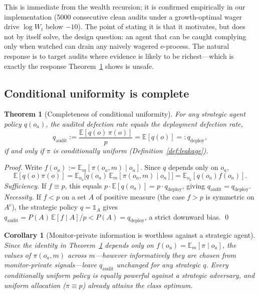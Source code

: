\documentclass[sigconf,anonymous]{aamas}
\theoremstyle{plain}
\newtheorem{theorem}{Theorem}
\newtheorem{corollary}{Corollary}
\theoremstyle{definition}
\begin{document}
This is immediate from the wealth recursion; it is confirmed empirically in
our implementation (5000 consecutive clean audits under a growth-optimal
wager drive $\log W_t$ below $-10$). The point of stating it is that it
motivates, but does not by itself solve, the design question: an agent that
can be caught complying only when watched can drain any naively wagered
e-process. The natural response is to target audits where evidence is
likely to be richest---which is exactly the response Theorem~\ref{thm:conditional-uniformity}
shows is unsafe.

\subsection{Conditional uniformity is complete}

\begin{theorem}[Completeness of conditional uniformity]
\label{thm:conditional-uniformity}
For any strategic agent policy $q(o_a)$, the audited defection rate equals
the deployment defection rate,
\[q_{\mathrm{audit}} := \frac{\mathbb{E}[q(o)\,\pi(o)]}{p} = \mathbb{E}[q(o)] =: q_{\mathrm{deploy}},\]
\emph{if and only if} $\pi$ is conditionally uniform (Definition~\ref{def:leakage}).
\end{theorem}

\begin{proof}
Write $f(o_a) := \mathbb{E}_m[\pi(o_a,m)\mid o_a]$. Since $q$ depends only
on $o_a$,
\[\mathbb{E}[q(o)\pi(o)] = \mathbb{E}_{o_a}\big[q(o_a)\,\mathbb{E}_m[\pi(o_a,m)\mid o_a]\big] = \mathbb{E}_{o_a}[q(o_a)f(o_a)].\]
\emph{Sufficiency.} If $f \equiv p$, this equals $p\cdot\mathbb{E}[q(o_a)] =
p\cdot q_{\mathrm{deploy}}$, giving $q_{\mathrm{audit}} = q_{\mathrm{deploy}}$.
\emph{Necessity.} If $f < p$ on a set $A$ of positive measure (the case
$f>p$ is symmetric on $A^c$), the strategic policy $q = \mathbb{1}_A$ gives
$q_{\mathrm{audit}} = P(A)\,\mathbb{E}[f\mid A]/p < P(A) = q_{\mathrm{deploy}}$,
a strict downward bias. \qed
\end{proof}

\begin{corollary}[Monitor-private information is worthless against a strategic agent]
\label{cor:private-worthless}
Since the identity in Theorem~\ref{thm:conditional-uniformity} depends only
on $f(o_a) = \mathbb{E}_m[\pi\mid o_a]$, the values of $\pi(o_a,m)$ across
$m$---however informatively they are chosen from monitor-private
signals---leave $q_{\mathrm{audit}}$ unchanged for any strategic $q$. Every
conditionally uniform policy is equally powerful against a strategic
adversary, and uniform allocation ($\pi \equiv p$) already attains the class
optimum.
\end{corollary}
\end{document}
